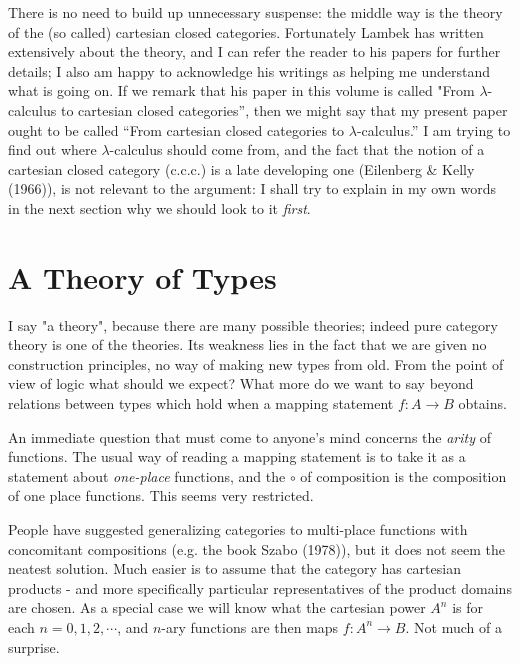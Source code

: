 \documentclass[12pt]{article}
\def\to{\rightarrow}
\def\ccc{{c.c.c.}}
\def\l{\lambda}
\begin{document}
There is no need to build up unnecessary suspense: the middle way is the theory of the (so called) cartesian closed categories.
Fortunately Lambek has written extensively about the theory, and I can refer the reader to his papers for fur­ther details; I also am happy to acknowledge his writings as helping me understand what is going on. If we remark that his paper in this volume is called "From $\l$-calculus to cartesian closed categories'', then we might say that my present paper ought to be called ``From cartesian closed categories to $\l$-calculus.''
I am trying to find out where $\l$-calculus should come from, and the fact that the notion of a cartesian closed category (\ccc) is a late developing one (Eilenberg \& Kelly (1966)), is not relevant to the argument: I shall try to explain in my own words in the next section why we should look to it {\it first}.

\section{A Theory of Types}

I say "a theory", because there are many possible theories; indeed pure category theory is one of the theories.
Its weak­ness lies in the fact that we are given no construction principles, no way of making new types from old. From the point of view of logic what should we expect? What more do we want to say beyond relations between types which hold when a mapping statement $f : A\to	B$ obtains.

An immediate question that must come to anyone's mind con­cerns the {\it arity} of functions. The usual way of reading a map­ping statement is to take it as a statement about {\it one-place} functions, and the $\circ$ of composition is the composition of one­ place functions. This seems very restricted.

People have suggested generalizing categories to multi-place functions with concomitant compositions (e.g. the book Szabo (1978)), but it does not seem the neatest solution. Much easier is to assume that the category has cartesian products - and more specifically particular representatives of the product
domains are chosen. As a special case we will know what the cartesian power $A^n$ is for each $n=0,1,2,\cdots$, and $n$-ary functions
are then maps $f: A^n\to B$. Not much of a surprise.
\end{document}
